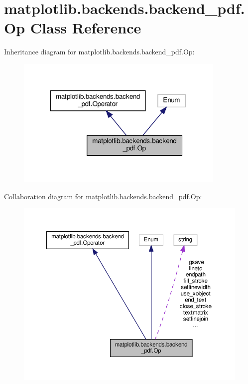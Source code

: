 \hypertarget{classmatplotlib_1_1backends_1_1backend__pdf_1_1Op}{}\section{matplotlib.\+backends.\+backend\+\_\+pdf.\+Op Class Reference}
\label{classmatplotlib_1_1backends_1_1backend__pdf_1_1Op}


Inheritance diagram for matplotlib.\+backends.\+backend\+\_\+pdf.\+Op\+:
\nopagebreak
\begin{figure}[H]
\begin{center}
\leavevmode
\includegraphics[width=284pt]{classmatplotlib_1_1backends_1_1backend__pdf_1_1Op__inherit__graph}
\end{center}
\end{figure}


Collaboration diagram for matplotlib.\+backends.\+backend\+\_\+pdf.\+Op\+:
\nopagebreak
\begin{figure}[H]
\begin{center}
\leavevmode
\includegraphics[width=350pt]{classmatplotlib_1_1backends_1_1backend__pdf_1_1Op__coll__graph}
\end{center}
\end{figure}
